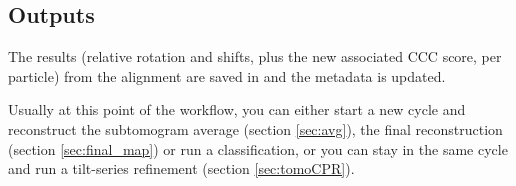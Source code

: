 \subsection{Outputs}

The results (relative rotation and shifts, plus the new associated CCC score, per particle) from the alignment are saved in  and the metadata is updated.

Usually at this point of the workflow, you can either start a new cycle and reconstruct the subtomogram average (section \ref{sec:avg}), the final reconstruction (section \ref{sec:final_map}) or run a classification, or you can stay in the same cycle and run a tilt-series refinement (section \ref{sec:tomoCPR}).